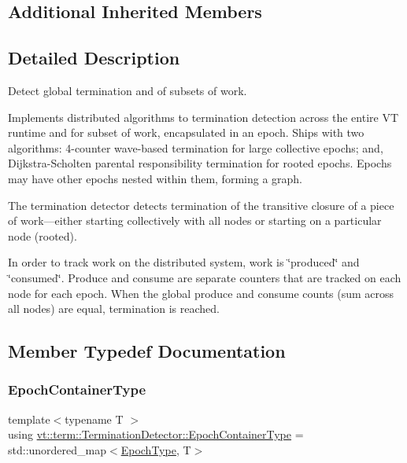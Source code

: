 \subsection*{Additional Inherited Members}


\subsection{Detailed Description}
Detect global termination and of subsets of work. 

Implements distributed algorithms to termination detection across the entire VT runtime and for subset of work, encapsulated in an epoch. Ships with two algorithms\+: 4-\/counter wave-\/based termination for large collective epochs; and, Dijkstra-\/\+Scholten parental responsibility termination for rooted epochs. Epochs may have other epochs nested within them, forming a graph.

The termination detector detects termination of the transitive closure of a piece of work---either starting collectively with all nodes or starting on a particular node (rooted).

In order to track work on the distributed system, work is \char`\"{}produced\char`\"{} and \char`\"{}consumed\char`\"{}. Produce and consume are separate counters that are tracked on each node for each epoch. When the global produce and consume counts (sum across all nodes) are equal, termination is reached. 

\subsection{Member Typedef Documentation}
\mbox{\label{structvt_1_1term_1_1_termination_detector_a69e2615b61e072977463eea5b20b7933}} 
\subsubsection{\texorpdfstring{Epoch\+Container\+Type}{EpochContainerType}}
{\footnotesize\ttfamily template$<$typename T $>$ \\
using \hyperlink{structvt_1_1term_1_1_termination_detector_a69e2615b61e072977463eea5b20b7933}{vt\+::term\+::\+Termination\+Detector\+::\+Epoch\+Container\+Type} =  std\+::unordered\+\_\+map$<$\hyperlink{namespacevt_a81d11b28122d43bf9834577e4a06440f}{Epoch\+Type}, T$>$}

